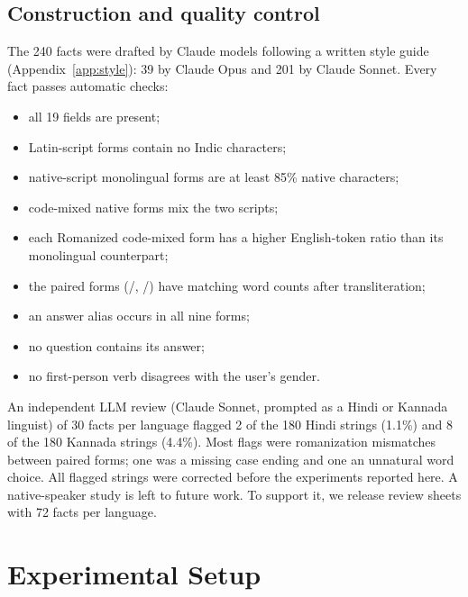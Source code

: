 \subsection{Construction and quality control}
\label{sec:quality}
The 240 facts were drafted by Claude models following a written style guide (Appendix~\ref{app:style}): 39 by Claude Opus and 201 by Claude Sonnet. Every fact passes automatic checks:
\begin{itemize}
\item all 19 fields are present;
\item Latin-script forms contain no Indic characters;
\item native-script monolingual forms are at least 85\% native characters;
\item code-mixed native forms mix the two scripts;
\item each Romanized code-mixed form has a higher English-token ratio than its monolingual counterpart;
\item the paired forms (/, /) have matching word counts after transliteration;
\item an answer alias occurs in all nine forms;
\item no question contains its answer;
\item no first-person verb disagrees with the user's gender.
\end{itemize}

An independent LLM review (Claude Sonnet, prompted as a Hindi or Kannada linguist) of 30 facts per language flagged 2 of the 180 Hindi strings (1.1\%) and 8 of the 180 Kannada strings (4.4\%). Most flags were romanization mismatches between paired forms; one was a missing case ending and one an unnatural word choice. All flagged strings were corrected before the experiments reported here. A native-speaker study is left to future work. To support it, we release review sheets with 72 facts per language.

\section{Experimental Setup}
\label{sec:setup}

